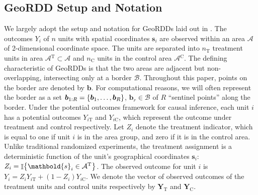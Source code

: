 \documentclass[letter,12pt]{article}
\DeclarePairedDelimiter{\curlybracket}{\lbrace}{\rbrace}
\newcommand{\cbr}[1]{\curlybracket*{#1}}
\DeclareMathOperator{\Ind}{\mathbb{I}}
\newcommand{\area}{\mathcal{A}}
\newcommand{\treat}{\mathrm{T}}
\newcommand{\ctrol}{\mathrm{C}}
\newcommand{\treatind}{Z}
\newcommand{\treatarea}{\area{}^{\treat}}
\newcommand{\ctrolarea}{\area{}^{\ctrol}}
\newcommand{\svec}{\mathbold{s}}
\newcommand{\Yvec}{\mathbold{Y}}
\newcommand{\yt}{\Yvec_{\treat}}
\newcommand{\yc}{\Yvec_{\ctrol}}
\newcommand{\border}{\mathcal{B}}
\newcommand{\sentinel}{\bm{b}}
\newcommand{\numsent}{R}
\newcommand{\sentinels}{\sentinel_{1:\numsent}}
\newcommand{\isent}{r}
\newcommand{\sentinelset}{\cbr{\sentinel_1,\ldots,\sentinel_\numsent}}
\begin{document}
\label{sec:geordd_model}

\hypertarget{geordd-setup-and-notation}{%
\subsection{GeoRDD Setup and Notation}\label{geordd-setup-and-notation}}

We largely adopt the setup and notation for GeoRDDs laid out in \cite{keele_titiunik_2015}.
The outcomes \(Y_i\) of \(n\) units with spatial coordinates \(\svec_i\) are observed within an area \(\area\) of 2-dimensional coordinate space.
The units are separated into \(n_\treat\) treatment units in area \(\treatarea \subset \area\)
and \(n_\ctrol\) units in the control area \(\ctrolarea\).
The defining characteristic of GeoRDDs is that the two areas are adjacent but non-overlapping, intersecting only at a border \(\border\).
Throughout this paper, points on the border are denoted by \(\sentinel\).
For computational reasons, we will often represent the border as a set \(\sentinels=\sentinelset\), \(\sentinel_\isent \in \border\) of \(\numsent\) ``sentinel points'' along the border.
Under the potential outcomes framework for causal inference, each unit \(i\) has a potential outcomes \(Y_{i\treat}\) and \(Y_{i\ctrol}\), which represent the outcome under treatment and control respectively.
Let \(\treatind_i\) denote the treatment indicator, which is equal to one if unit \(i\) is in the area group, and zero if it is in the control area.
Unlike traditional randomized experiments, the treatment assignment is a deterministic function of the unit's geographical coordinates \(\svec_i\): \(\treatind_i = \Ind\cbr{\svec_i \in \treatarea}\).
The observed outcome for unit \(i\) is \(Y_i = \treatind_i Y_{i\treat} + (1 - \treatind_i) Y_{i\ctrol}\).
We denote the vector of observed outcomes of the treatment units and control units respectively by \(\yt\) and \(\yc\).
\end{document}
